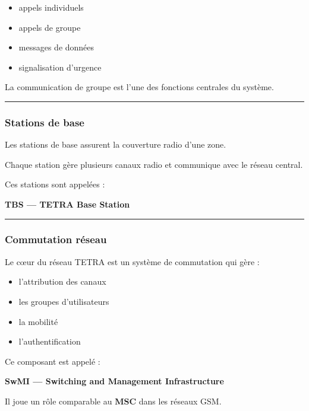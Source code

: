 \documentclass[
  french,
]{article}
\providecommand{\tightlist}{%
  \setlength{\itemsep}{0pt}\setlength{\parskip}{0pt}}
\begin{document}
\begin{itemize}
\tightlist
\item
  appels individuels
\item
  appels de groupe
\item
  messages de données
\item
  signalisation d'urgence
\end{itemize}

La communication de groupe est l'une des fonctions centrales du système.

\begin{center}\rule{0.5\linewidth}{0.5pt}\end{center}

\subsubsection{Stations de base}\label{stations-de-base}

Les stations de base assurent la couverture radio d'une zone.

Chaque station gère plusieurs canaux radio et communique avec le réseau
central.

Ces stations sont appelées :

\textbf{TBS --- TETRA Base Station}

\begin{center}\rule{0.5\linewidth}{0.5pt}\end{center}

\subsubsection{Commutation réseau}\label{commutation-ruxe9seau}

Le cœur du réseau TETRA est un système de commutation qui gère :

\begin{itemize}
\tightlist
\item
  l'attribution des canaux
\item
  les groupes d'utilisateurs
\item
  la mobilité
\item
  l'authentification
\end{itemize}

Ce composant est appelé :

\textbf{SwMI --- Switching and Management Infrastructure}

Il joue un rôle comparable au \textbf{MSC} dans les réseaux GSM.
\end{document}
